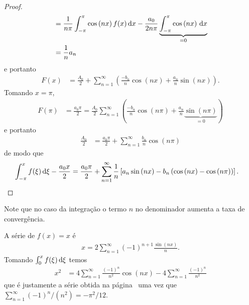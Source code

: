 \begin{proof}
\begin{align*}
        &= \frac{1}{n \pi} \int_{-\pi}^\pi \cos\left( n x \right) f(x) \, \mathrm{d}x - \frac{a_0}{2 n \pi} \underbrace{\int_{-\pi}^\pi \cos\left( n x \right) \, \mathrm{d}x}_{=0} \\
        &= \frac{1}{n} a_n
    \end{align*}
    e portanto
    \begin{align*}
        F(x) &= \frac{A_0}{2} + \sum_{n = 1}^\infty \left( \frac{-b_n}{n} \cos\left( n x \right) + \frac{a_n}{n} \sin\left( n x \right) \right).
    \end{align*}
    Tomando $x = \pi$,
    \begin{align*}
        F(\pi) &= \frac{a_0 \pi}{2} = \frac{A_0}{2} \sum_{n = 1}^\infty \left( \frac{-b_n}{n} \cos\left( n \pi \right) + \frac{a_n}{n} \underbrace{\sin\left( n \pi \right)}_{=0} \right)
    \end{align*}
    e portanto
    \begin{align*}
        \frac{A_0}{2} &= \frac{a_0 \pi}{2} + \sum_{n = 1}^\infty \frac{b_n}{n} \cos\left( n \pi \right)
    \end{align*}
    de modo que
    \begin{align*}
        \int_{-\pi}^x f(\xi) \, \mathrm{d}\xi - \frac{a_0 x}{2} &= \frac{a_0 \pi}{2} + \sum_{n = 1}^\infty \frac{1}{n} \left[ a_n \sin\left( n x \right) - b_n \left( \cos\left( n x \right) - \cos\left( n \pi \right) \right) \right]. \qedhere
    \end{align*}
\end{proof}
\begin{obs}
    Note que no caso da integra\c{c}\~{a}o o termo $n$ no denominador aumenta a taxa de converg\^{e}ncia.
\end{obs}
\begin{exem}
    A s\'{e}rie de $f(x) = x$ \'{e}
    \begin{align*}
        x = 2 \sum_{n = 1}^\infty (-1)^{n + 1} \frac{\sin\left( n x \right)}{n}.
    \end{align*}
    Tomando $\int_0^x f(\xi) \, \mathrm{d}\xi$ temos
    \begin{align*}
        x^2 &= 4 \sum_{n = 1}^\infty \frac{(-1)^n}{n^2} \cos\left( n x \right) - 4 \sum_{n = 1}^\infty \frac{(-1)^n}{n^2}
    \end{align*}
    que \'{e} justamente a s\'{e}rie obtida na p\'{a}gina~\pageref{exem:fourier:x^2} uma vez que $\sum_{n = 1}^\infty (-1)^n / (n^2) = -\pi^2 / 12$.
\end{exem}

